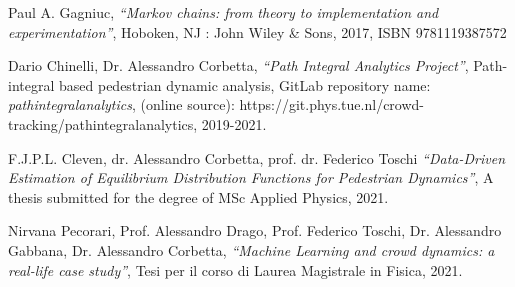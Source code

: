 \documentclass{standalone}
\begin{document}
\begin{thebibliography}{99}
Paul A. Gagniuc,
  \textit{“Markov chains: from theory to implementation and experimentation”}, 
Hoboken, NJ : John Wiley \& Sons, 
2017,
ISBN 9781119387572

Dario Chinelli, Dr. Alessandro Corbetta,
  \textit{“Path Integral Analytics Project”}, 
Path-integral based pedestrian dynamic analysis,
GitLab repository name: \emph{pathintegralanalytics},
(online source): https://git.phys.tue.nl/crowd-tracking/pathintegralanalytics,
2019-2021.

F.J.P.L. Cleven, dr. Alessandro Corbetta, prof. dr. Federico Toschi
  \textit{“Data-Driven Estimation of Equilibrium Distribution Functions for Pedestrian Dynamics”}, 
A thesis submitted for the degree of MSc Applied Physics,
2021.

Nirvana Pecorari, Prof. Alessandro Drago, Prof. Federico Toschi, Dr. Alessandro Gabbana, Dr. Alessandro Corbetta,
  \textit{“Machine Learning and crowd dynamics: a real-life case study”}, 
Tesi per il corso di Laurea Magistrale in Fisica,
2021.



\end{thebibliography}
\end{document}
